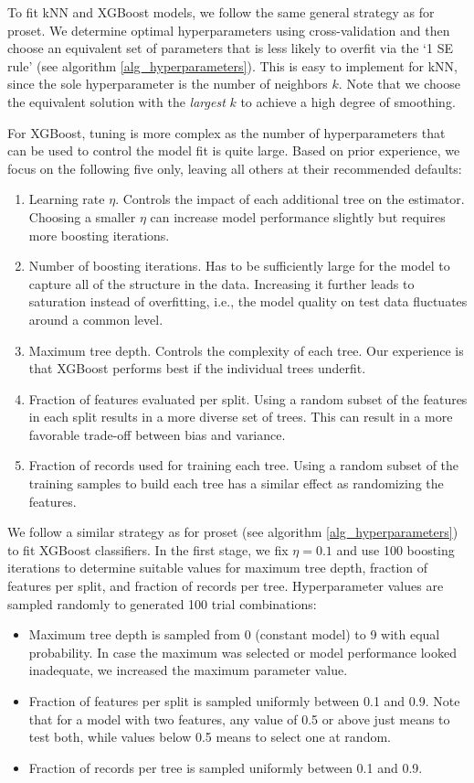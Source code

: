 %
To fit kNN and XGBoost models, we follow the same general strategy as for proset.
We determine optimal hyperparameters using cross-validation and then choose an equivalent set of parameters that is less likely to overfit via the `1 SE rule' (see algorithm \ref{alg_hyperparameters}).
This is easy to implement for kNN, since the sole hyperparameter is the number of neighbors $k$.
Note that we choose the equivalent solution with the \textit{largest} $k$ to achieve a high degree of smoothing.\par
%
For XGBoost, tuning is more complex as the number of hyperparameters that can be used to control the model fit is quite large.
Based on prior experience, we focus on the following five only, leaving all others at their recommended defaults:
%
\begin{enumerate}
\item Learning rate $\eta$.
Controls the impact of each additional tree on the estimator.
Choosing a smaller $\eta$ can increase model performance slightly but requires more boosting iterations.
%
\item Number of boosting iterations.
Has to be sufficiently large for the model to capture all of the structure in the data.
Increasing it further leads to saturation instead of overfitting, i.e., the model quality on test data fluctuates around a common level.
%
\item Maximum tree depth.
Controls the complexity of each tree.
Our experience is that XGBoost performs best if the individual trees underfit.
%
\item Fraction of features evaluated per split.
Using a random subset of the features in each split results in a more diverse set of trees.
This can result in a more favorable trade-off between bias and variance.
%
\item Fraction of records used for training each tree.
Using a random subset of the training samples to build each tree has a similar effect as randomizing the features.
\end{enumerate}
%
We follow a similar strategy as for proset (see algorithm \ref{alg_hyperparameters}) to fit XGBoost classifiers.
In the first stage, we fix $\eta=0.1$ and use 100 boosting iterations to determine suitable values for maximum tree depth, fraction of features per split, and fraction of records per tree.
Hyperparameter values are sampled randomly to generated 100 trial combinations:
%
\begin{itemize}
\item Maximum tree depth is sampled from 0 (constant model) to 9 with equal probability.
In case the maximum was selected or model performance looked inadequate, we increased the maximum parameter value.
%
\item Fraction of features per split is sampled uniformly between 0.1 and 0.9.
Note that for a model with two features, any value of 0.5 or above just means to test both, while values below 0.5 means to select one at random.
%
\item Fraction of records per tree is sampled uniformly between 0.1 and 0.9.
\end{itemize}
